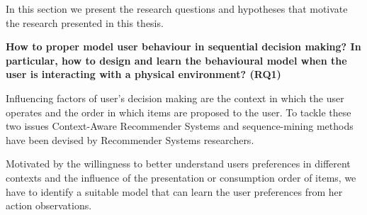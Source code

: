 In this section we present the research questions and hypotheses that motivate the research presented in this thesis. \newline

% 
\noindent\textbf{How to proper model user behaviour in sequential decision making? In particular, how to design and learn the behavioural model when the user is interacting with a physical environment? (RQ1)}


Influencing factors of user's decision making are the context in which the user operates and the order in which items are proposed to the user. To tackle these two issues Context-Aware Recommender Systems \cite{adomavicius:2011} and sequence-mining methods \cite{palumbo:2017, mobasher:2002, jannach2017} have been devised by Recommender Systems researchers.

Motivated by the willingness to better understand users preferences in different contexts and the influence of the presentation or consumption order of items, we have to identify a suitable model that can learn the user preferences from her action observations. 


